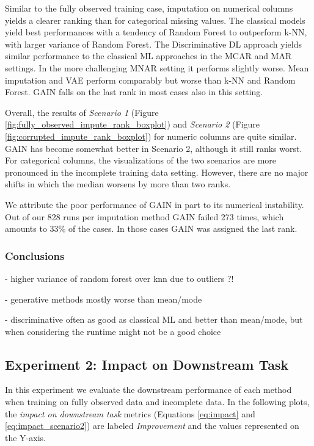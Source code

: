 Similar to the fully observed training case, imputation on numerical columns yields a clearer ranking than for categorical missing values. The classical models yield best performances with a tendency of Random Forest to outperform k-NN, with larger variance of Random Forest. The Discriminative DL approach yields similar performance to the classical ML approaches in the MCAR and MAR settings. In the more challenging MNAR setting it performs slightly worse. Mean imputation and VAE perform comparably but worse than k-NN and Random Forest. GAIN falls on the last rank in most cases also in this setting.

Overall, the results of \textit{Scenario 1} (Figure \ref{fig:fully_observed_impute_rank_boxplot}) and \textit{Scenario 2} (Figure \ref{fig:corrupted_impute_rank_boxplot}) for numeric columns are quite similar. GAIN has become somewhat better in Scenario 2, although it still ranks worst. For categorical columns, the visualizations of the two scenarios are more pronounced in the incomplete training data setting. However, there are no major shifts in which the median worsens by more than two ranks. 

We attribute the poor performance of GAIN in part to its numerical instability. Out of our 828 runs per imputation method GAIN failed 273 times, which amounts to 33\% of the cases. In those cases GAIN was assigned the last rank.

\subsubsection{Conclusions}

- higher variance of random forest over knn due to outliers ?!

- generative methods mostly worse than mean/mode

- discriminative often as good as classical ML and better than mean/mode, but when considering the runtime might not be a good choice



\subsection{Experiment 2: Impact on Downstream Task}

In this experiment we evaluate the downstream performance of each method when training on fully observed data and incomplete data. In the following plots, the \textit{impact on downstream task} metrics (Equations \ref{eq:impact} and \ref{eq:impact_scenario2}) are labeled \textit{Improvement} and the values represented on the Y-axis.


